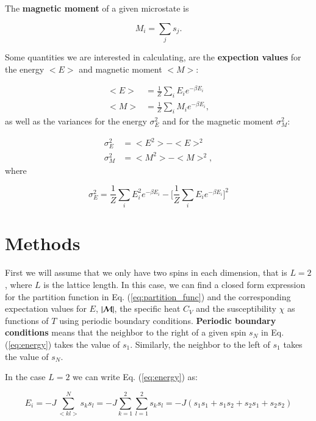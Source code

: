 \documentclass{article}
\begin{document}
\begin{multicols}{2}
The \textbf{magnetic moment} of a given microstate is

\begin{equation}
	M_i = \sum_j s_j.
\end{equation} 

Some quantities we are interested in calculating, are the \textbf{expection values} for the energy $<E>$ and magnetic moment $<M>$:

\begin{equation}
\begin{aligned}
	<E> &= \frac{1}{Z} \sum_i E_i e^{- \beta E_i} \\
	<M> &= \frac{1}{Z} \sum_i M_i e^{- \beta E_i},
\end{aligned}
\end{equation}
as well as the variances for the energy $\sigma_E^2$ and for the magnetic moment $\sigma_M^2$:

\begin{equation}
\begin{aligned}
	\sigma_E^2 &= <E^2> - <E>^2 \\
	\sigma_M^2 &= <M^2> - <M>^2,
\end{aligned}
\end{equation}
where

\begin{equation}
	\sigma_E^2 = \frac{1}{Z} \sum_i E_i^2 e^{- \beta E_i} - \bigg[ \frac{1}{Z} \sum_i E_i e^{- \beta E_i} \bigg]^2
\end{equation}


\section{Methods}

First we will assume that we only have two spins in each dimension, that is $L = 2$, where $L$ is the lattice length. In this case, we can find a closed form expression for the partition function in Eq. (\ref{eq:partition_func}) and the corresponding expectation values for $E$, $|{\cal M}|$, the specific heat $C_V$ and the susceptibility $\chi$ as functions of $T$ using periodic boundary conditions. \textbf{Periodic boundary conditions} means that the neighbor to the right of a given spin $s_N$ in Eq. (\ref{eq:energy}) takes the value of $s_1$. Similarly, the neighbor to the left of $s_1$ takes the value of $s_N$. 

In the case $L = 2$ we can write Eq. (\ref{eq:energy}) as:

\begin{equation}\label{eq:energy2}
	E_i = -J \sum_{<kl>}^{N}s_k s_l = -J \sum_{k = 1}^{2} \sum_{l = 1}^{2} s_k s_l = - J (s_1 s_1 + s_1 s_2 + s_2 s_1 + s_2 s_2)
\end{equation}


\end{multicols}
\end{document}
